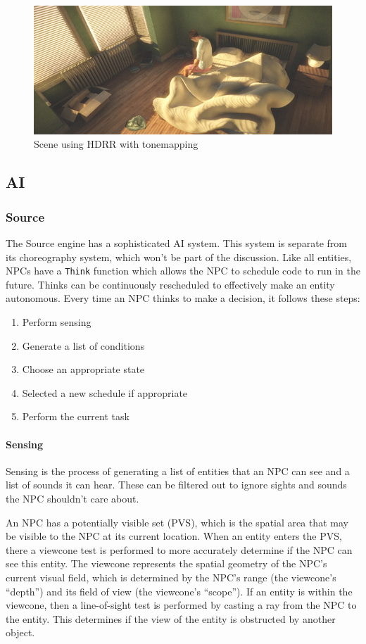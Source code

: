 \documentclass[a4paper, 12pt]{scrartcl}
\begin{document}
\begin{figure}[!htb]
  \centering
  \includegraphics[width=0.75\linewidth]{images/unity_hdrr.jpg}
  \caption{Scene using HDRR with tonemapping}
  \label{fig:unity_hdr}
\end{figure}

\subsection{AI}
\subsubsection{Source}
The Source engine has a sophisticated AI system. This system is separate from its choreography system, which won't be part of the discussion. Like all entities, NPCs have a \texttt{Think} function which allows the NPC to schedule code to run in the future. Thinks can be continuously rescheduled to effectively make an entity autonomous. Every time an NPC thinks to make a decision, it follows these steps:

\begin{enumerate}
  \item Perform sensing
  \item Generate a list of conditions
  \item Choose an appropriate state
  \item Selected a new schedule if appropriate
  \item Perform the current task
\end{enumerate}

\paragraph{Sensing}
Sensing is the process of generating a list of entities that an NPC can see and a list of sounds it can hear. These can be filtered out to ignore sights and sounds the NPC shouldn't care about.

An NPC has a potentially visible set (PVS), which is the spatial area that may be visible to the NPC at its current location. When an entity enters the PVS, there a viewcone test is performed to more accurately determine if the NPC can see this entity. The viewcone represents the spatial geometry of the NPC's current visual field, which is determined by the NPC's range (the viewcone's ``depth'') and its field of view (the viewcone's ``scope''). If an entity is within the viewcone, then a line-of-sight test is performed by casting a ray from the NPC to the entity. This determines if the view of the entity is obstructed by another object.
\end{document}
